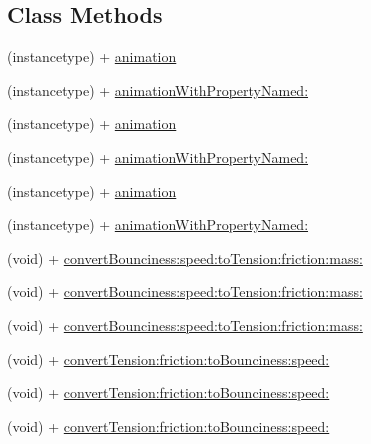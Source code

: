 \subsection*{Class Methods}
\begin{DoxyCompactItemize}
\item 
(instancetype) + \mbox{\hyperlink{interface_p_o_p_spring_animation_aec360b7313cea71ed6133ff183c1423c}{animation}}
\item 
(instancetype) + \mbox{\hyperlink{interface_p_o_p_spring_animation_a6e5bd208ce4b013a884c97dcebfc33b4}{animation\+With\+Property\+Named\+:}}
\item 
(instancetype) + \mbox{\hyperlink{interface_p_o_p_spring_animation_aec360b7313cea71ed6133ff183c1423c}{animation}}
\item 
(instancetype) + \mbox{\hyperlink{interface_p_o_p_spring_animation_a6e5bd208ce4b013a884c97dcebfc33b4}{animation\+With\+Property\+Named\+:}}
\item 
(instancetype) + \mbox{\hyperlink{interface_p_o_p_spring_animation_aec360b7313cea71ed6133ff183c1423c}{animation}}
\item 
(instancetype) + \mbox{\hyperlink{interface_p_o_p_spring_animation_a6e5bd208ce4b013a884c97dcebfc33b4}{animation\+With\+Property\+Named\+:}}
\item 
(void) + \mbox{\hyperlink{interface_p_o_p_spring_animation_a64169073c5afd559e939783a7f3f4065}{convert\+Bounciness\+:speed\+:to\+Tension\+:friction\+:mass\+:}}
\item 
(void) + \mbox{\hyperlink{interface_p_o_p_spring_animation_a64169073c5afd559e939783a7f3f4065}{convert\+Bounciness\+:speed\+:to\+Tension\+:friction\+:mass\+:}}
\item 
(void) + \mbox{\hyperlink{interface_p_o_p_spring_animation_a64169073c5afd559e939783a7f3f4065}{convert\+Bounciness\+:speed\+:to\+Tension\+:friction\+:mass\+:}}
\item 
(void) + \mbox{\hyperlink{interface_p_o_p_spring_animation_a6b5d0ffdb16b10c6de3575d9d45b831b}{convert\+Tension\+:friction\+:to\+Bounciness\+:speed\+:}}
\item 
(void) + \mbox{\hyperlink{interface_p_o_p_spring_animation_a6b5d0ffdb16b10c6de3575d9d45b831b}{convert\+Tension\+:friction\+:to\+Bounciness\+:speed\+:}}
\item 
(void) + \mbox{\hyperlink{interface_p_o_p_spring_animation_a6b5d0ffdb16b10c6de3575d9d45b831b}{convert\+Tension\+:friction\+:to\+Bounciness\+:speed\+:}}
\end{DoxyCompactItemize}
